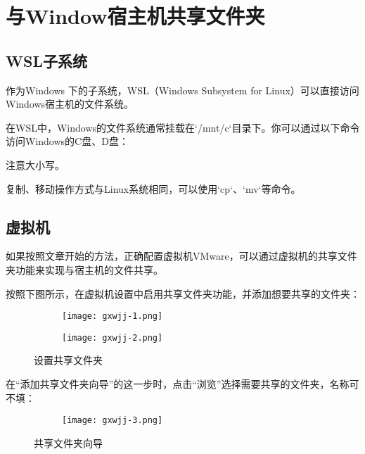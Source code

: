 

\section{与Window宿主机共享文件夹}
\label{sec:appendix-ubuntu-shared-folder}

\subsection{WSL子系统}
作为Windows 下的子系统，WSL（Windows Subsystem for Linux）可以直接访问Windows宿主机的文件系统。

在WSL中，Windows的文件系统通常挂载在`/mnt/c`目录下。你可以通过以下命令访问Windows的C盘、D盘：
注意大小写。

复制、移动操作方式与Linux系统相同，可以使用`cp`、`mv`等命令。

\subsection{虚拟机}
如果按照文章开始的方法，正确配置虚拟机VMware，可以通过虚拟机的共享文件夹功能来实现与宿主机的文件共享。

按照下图所示，在虚拟机设置中启用共享文件夹功能，并添加想要共享的文件夹：
\begin{figure}[h]
    \centering
    \begin{subfigure}[c]{0.6\textwidth}
      \texttt{[image: gxwjj-1.png]}
    \end{subfigure}
    \hfill
    \begin{subfigure}[c]{0.35\textwidth}
      \texttt{[image: gxwjj-2.png]}
    \end{subfigure}
    \caption{设置共享文件夹}
    \label{fig:shared-folder-setup}
\end{figure}

在“添加共享文件夹向导”的这一步时，点击“浏览”选择需要共享的文件夹，名称可不填：
\begin{figure}[h]
    \centering
    \begin{subfigure}[c]{0.5\textwidth}
    \texttt{[image: gxwjj-3.png]}
    \end{subfigure}    
    \caption{共享文件夹向导}
    \label{fig:shared-folder-wizard}
\end{figure}

